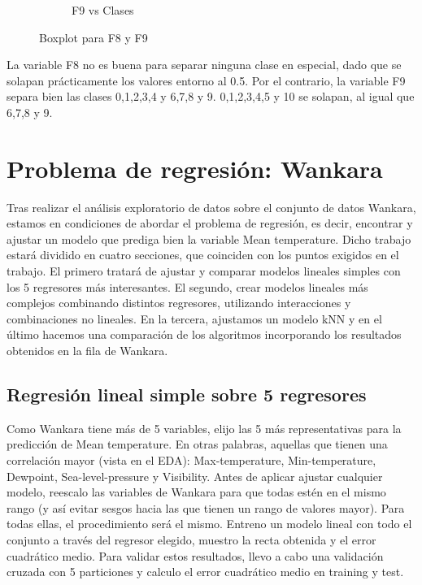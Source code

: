 \begin{itemize}
\begin{itemize}
\begin{figure}[H]
\begin{subfigure}{.5\textwidth}
				\caption{F9 vs Clases}
				\label{fig:bpmF9}
			\end{subfigure}
			\caption{Boxplot para F8 y F9}
			\label{fig:bpm89}
		\end{figure}
	
		La variable F8 no es buena para separar ninguna clase en especial, dado que se solapan prácticamente los valores entorno al 0.5. Por el contrario, la variable F9 separa bien las clases 0,1,2,3,4 y 6,7,8 y 9. 0,1,2,3,4,5 y 10 se solapan, al igual que 6,7,8 y 9.
	\end{itemize}

\end{itemize}

\newpage

\section{Problema de regresión: Wankara}

Tras realizar el análisis exploratorio de datos sobre el conjunto de datos Wankara, estamos en condiciones de abordar el problema de regresión, es decir, encontrar y ajustar un modelo que prediga bien la variable Mean temperature. Dicho trabajo estará dividido en cuatro secciones, que coinciden con los puntos exigidos en el trabajo. El primero tratará de ajustar y comparar modelos lineales simples con los 5 regresores más interesantes. El segundo, crear modelos lineales más complejos combinando distintos regresores, utilizando interacciones y combinaciones no lineales. En la tercera, ajustamos un modelo kNN y en el último hacemos una comparación de los algoritmos incorporando los resultados obtenidos en la fila de Wankara.

\subsection{Regresión lineal simple sobre 5 regresores}

Como Wankara tiene más de 5 variables, elijo las 5 más representativas para la predicción de Mean temperature. En otras palabras, aquellas que tienen una correlación mayor (vista en el EDA): Max-temperature, Min-temperature, Dewpoint, Sea-level-pressure y Visibility. Antes de aplicar ajustar cualquier modelo, reescalo las variables de Wankara para que todas estén en el mismo rango (y así evitar sesgos hacia las que tienen un rango de valores mayor). Para todas ellas, el procedimiento será el mismo. Entreno un modelo lineal con todo el conjunto a través del regresor elegido, muestro la recta obtenida y el error cuadrático medio. Para validar estos resultados, llevo a cabo una validación cruzada con 5 particiones y calculo el error cuadrático medio en training y test.

